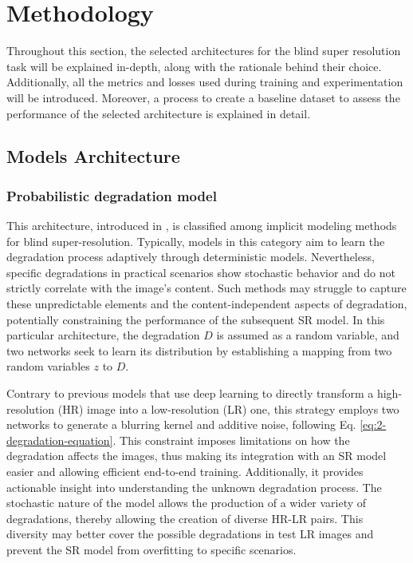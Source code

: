 \section{Methodology} \label{sec:methodology}

Throughout this section, the selected architectures for the blind super resolution task will be explained in-depth, along with the rationale behind their choice. Additionally, all the metrics and losses used during training and experimentation will be introduced. 
Moreover, a process to create a baseline dataset to assess the performance of the selected architecture is explained in detail. 


\subsection{Models Architecture}

\subsubsection{Probabilistic degradation model}

    This architecture, introduced in \cite{luo2022learning}, is classified among implicit modeling methods for blind super-resolution.
    Typically, models in this category aim to learn the degradation process adaptively through deterministic models. Nevertheless, specific degradations in practical scenarios show stochastic behavior and do not strictly correlate with the image's content. Such methods may struggle to capture these unpredictable elements and the content-independent aspects of degradation, potentially constraining the performance of the subsequent SR model. In this particular architecture, the degradation \(D\) is assumed as a random variable, and two networks seek to learn its distribution by establishing a mapping from two random variables \(z\) to \(D\). 

    Contrary to previous models that use deep learning to directly transform a high-resolution (HR) image into a low-resolution (LR) one, this strategy employs two networks to generate a blurring kernel and additive noise, following Eq. \ref{eq:2-degradation-equation}. This constraint imposes limitations on how the degradation affects the images, thus making its integration with an SR model easier and allowing efficient end-to-end training. Additionally, it provides actionable insight into understanding the unknown degradation process.
    The stochastic nature of the model allows the production of a wider variety of degradations, thereby allowing the creation of diverse HR-LR pairs. This diversity may better cover the possible degradations in test LR images and prevent the SR model from overfitting to specific scenarios.

